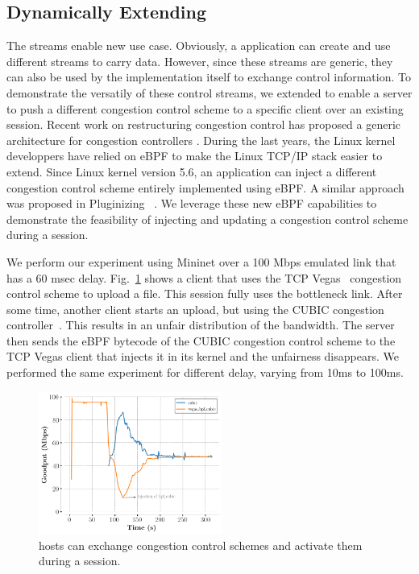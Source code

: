\subsection{Dynamically Extending \tcpls}

The \tcpls streams enable new use case. Obviously, a \tcpls application can
create and use different streams to carry data. However, since these streams
are generic, they can also be used by the \tcpls implementation itself to
exchange control information. To demonstrate the versatily of these control
streams, we extended \tcpls to enable a server to push a different congestion
control scheme to a specific client over an existing \tcpls session. Recent
work on restructuring congestion control has proposed a generic architecture
for congestion controllers \cite{narayan2018restructuring}.
During the last years, the Linux kernel developpers have relied on eBPF
to make the Linux TCP/IP stack \cite{brakmo2017tcp,tran2020beyond} easier
to extend. Since Linux kernel version 5.6, an application can inject
a different congestion control scheme entirely implemented using eBPF. A similar approach was proposed in Pluginizing \quic~\cite{de2019pluginizing}.
We leverage these new eBPF capabilities to demonstrate the feasibility of injecting and updating a congestion control scheme during a \tcpls session.

We perform our experiment using Mininet  over a 100 Mbps emulated link that has a 60 msec delay. Fig.~\ref{fig:vegasCubic} shows a client that uses the TCP Vegas~\cite{10.1145/190314.190317} congestion control scheme to upload a file. This \tcpls session fully uses the bottleneck link. After some time, another client starts an upload, but using the CUBIC congestion controller~\cite{rfc8312}. This results in an unfair distribution of the bandwidth. The server then sends the eBPF bytecode of the CUBIC congestion control scheme to the TCP Vegas client that injects it in its kernel and the unfairness disappears.  We performed the same experiment for different delay, varying from 10ms to 100ms.

\begin{figure}[!t]
  \begin{center}
    \includegraphics[width=6cm]{pretty_plotify/plots/vegas_cubic.png}
  \end{center}
  \caption{\tcpls hosts can exchange congestion control schemes and activate them during a \tcpls session.}
  \label{fig:vegasCubic}
\end{figure}
